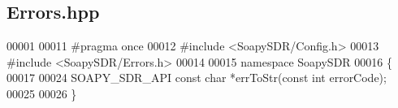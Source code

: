 \subsection{Errors.\+hpp}
\label{Errors_8hpp_source}

\begin{DoxyCode}
00001 
00011 \textcolor{preprocessor}{#pragma once}
00012 \textcolor{preprocessor}{#include <SoapySDR/Config.h>}
00013 \textcolor{preprocessor}{#include <SoapySDR/Errors.h>}
00014 
00015 \textcolor{keyword}{namespace }SoapySDR
00016 \{
00017 
00024 SOAPY_SDR_API \textcolor{keyword}{const} \textcolor{keywordtype}{char} *errToStr(\textcolor{keyword}{const} \textcolor{keywordtype}{int} errorCode);
00025 
00026 \}
\end{DoxyCode}
